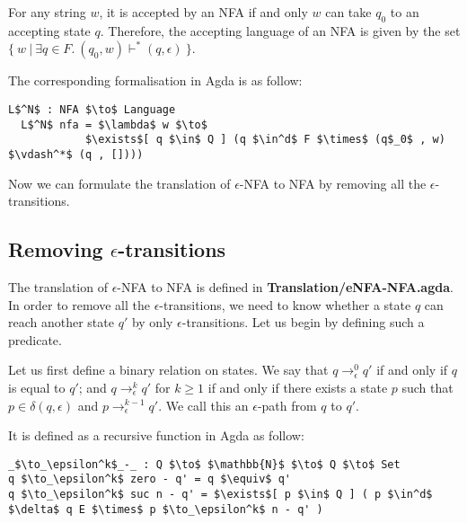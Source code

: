 \begin{defn}
\noindent For any string \(w\), it is accepted by an NFA
if and only \(w\) can take \(q_0\) to an accepting state \(q\). Therefore, the
accepting language of an NFA is given by the set \(\{\ w\ |\ \exists q\in F.\ (q_0,w) \vdash^* (q,\epsilon)\ \}\). 
\end{defn}

\par The corresponding formalisation in Agda is as follow: 
\begin{lstlisting}[mathescape=true,xleftmargin=.3\textwidth]
  L$^N$ : NFA $\to$ Language
  L$^N$ nfa = $\lambda$ w $\to$ 
            $\exists$[ q $\in$ Q ] (q $\in^d$ F $\times$ (q$_0$ , w) $\vdash^*$ (q , [])))
\end{lstlisting} 

\par Now we can formulate the translation of \(\epsilon\)-NFA to NFA
by removing all the \(\epsilon\)-transitions. 


\subsection{Removing \(\epsilon\)-transitions}
\par The translation of \(\epsilon\)-NFA to NFA is defined in
\textbf{Translation/eNFA-NFA.agda}. In order to remove all the \(\epsilon\)-transitions, we need to
know whether a state \(q\) can reach another state \(q'\) by only
\(\epsilon\)-transitions. Let us begin by defining such a predicate. 

\begin{defn}
\noindent Let us first define a binary relation on states. We say that
\(q \to_\epsilon^0 q'\) if and only if
\(q\) is equal to \(q'\); and \(q \to_\epsilon^k q'\) for \(k \geq
1\) if and only if there exists a state \(p\) such that \(p \in
\delta (q,\epsilon)\) and \(p \to_\epsilon^{k-1} q'\). We call this
an \(\epsilon\)-path from \(q\) to \(q'\).
\end{defn}

\par It is defined as a recursive function in Agda as follow:
\begin{lstlisting}[mathescape=true,xleftmargin=.3\textwidth]
_$\to_\epsilon^k$_-_ : Q $\to$ $\mathbb{N}$ $\to$ Q $\to$ Set
q $\to_\epsilon^k$ zero - q' = q $\equiv$ q'
q $\to_\epsilon^k$ suc n - q' = $\exists$[ p $\in$ Q ] ( p $\in^d$ $\delta$ q E $\times$ p $\to_\epsilon^k$ n - q' )
\end{lstlisting}


